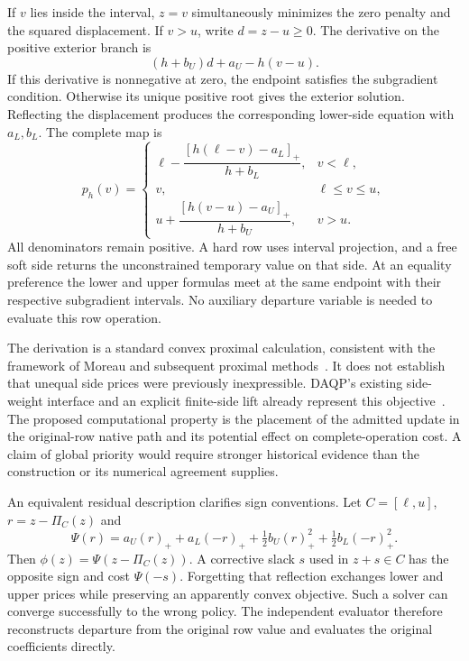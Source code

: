 If $v$ lies inside the interval, $z=v$ simultaneously minimizes the zero
penalty and the squared displacement. If $v>u$, write $d=z-u\geq0$.
The derivative on the positive exterior branch is
\begin{equation}\label{eq:paper-upper-derivative}
 (h+b_U)d+a_U-h(v-u).
\end{equation}
If this derivative is nonnegative at zero, the endpoint satisfies the
subgradient condition. Otherwise its unique positive root gives the
exterior solution. Reflecting the displacement produces the corresponding
lower-side equation with $a_L,b_L$. The complete map is
\begin{equation}\label{eq:paper-side-prox}
p_h(v)=\begin{cases}
\ell-\dfrac{[h(\ell-v)-a_L]_+}{h+b_L},&v<\ell,\\[6pt]
v,&\ell\leq v\leq u,\\[3pt]
u+\dfrac{[h(v-u)-a_U]_+}{h+b_U},&v>u.
\end{cases}
\end{equation}
All denominators remain positive. A hard row uses interval projection,
and a free soft side returns the unconstrained temporary value on that
side. At an equality preference the lower and upper formulas meet at the
same endpoint with their respective subgradient intervals. No auxiliary
departure variable is needed to evaluate this row operation.

The derivation is a standard convex proximal calculation, consistent with
the framework of Moreau and subsequent proximal methods~\cite{moreau,prox}.
It does not establish that unequal side prices were previously
inexpressible. DAQP's existing side-weight interface and an explicit
finite-side lift already represent this objective~\cite{daqp}. The proposed
computational property is the placement of the admitted update in the
original-row native path and its potential effect on complete-operation
cost. A claim of global priority would require stronger historical
evidence than the construction or its numerical agreement supplies.

An equivalent residual description clarifies sign conventions. Let
$C=[\ell,u]$, $r=z-\Pi_C(z)$ and
\begin{equation}\label{eq:paper-asym-residual}
 \Psi(r)=a_U(r)_++a_L(-r)_+
             +\tfrac12b_U(r)_+^2+\tfrac12b_L(-r)_+^2.
\end{equation}
Then $\phi(z)=\Psi(z-\Pi_C(z))$. A corrective slack $s$ used in
$z+s\in C$ has the opposite sign and cost $\Psi(-s)$. Forgetting
that reflection exchanges lower and upper prices while preserving an
apparently convex objective. Such a solver can converge successfully to
the wrong policy. The independent evaluator therefore reconstructs
departure from the original row value and evaluates the original
coefficients directly.

